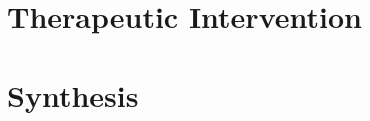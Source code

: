 \documentclass[11pt,a4paper,openright]{book}
\begin{document}






\part{Therapeutic Intervention}
\label{part:therapy}




\part{Synthesis}
\label{part:synthesis}



\backmatter



\end{document}
